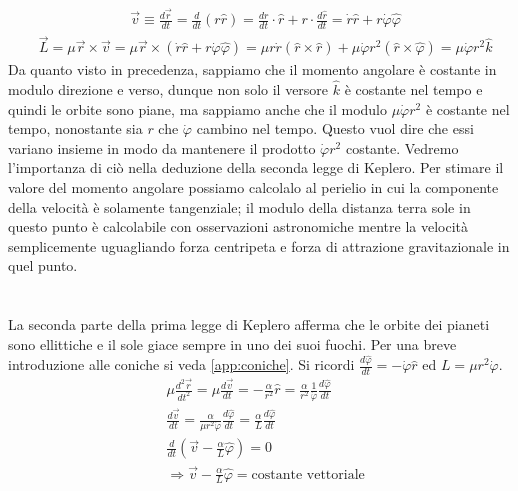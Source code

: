 \begin{align}\label{eq:velocitàgravitazionale}
&\vec{v} \equiv\frac{d\vec{r}}{dt}=\frac{d}{dt}(r\hat{r})=\frac{dr}{dt}\cdot \hat{r} + r\cdot \frac{d\hat{r}}{dt} = \dot{r}\hat{r} + r\dot{\varphi}\hat{\varphi}
\end{align}
\begin{align}\label{eq:momentoangolaregravitazionale}
&\vec{L} = \mu\vec{r} \times \vec{v} = \mu \vec{r} \times (\dot{r}\hat{r}+r\dot{\varphi}\hat{\varphi})=\mu r\dot{r}(\hat{r}\times\hat{r})+ \mu\dot{\varphi}r^2(\hat{r}\times\hat{\varphi}) = \mu\dot{\varphi}r^2 \hat{k} 
\end{align}
Da quanto visto in precedenza, sappiamo che il momento angolare è costante in modulo direzione e verso, dunque non solo il versore $\hat{k}$ è costante nel tempo e quindi le orbite sono piane, ma sappiamo anche che il modulo $\mu\dot{\varphi}r^2$ è costante nel tempo, nonostante sia $r$ che $\dot{\varphi}$ cambino nel tempo. Questo vuol dire che essi variano insieme in modo da mantenere il prodotto $\dot{\varphi}r^2$ costante. Vedremo l'importanza di ciò nella deduzione della seconda legge di Keplero. Per stimare il valore del momento angolare possiamo calcolalo al perielio in cui la componente della velocità è solamente tangenziale; il modulo della distanza terra sole in questo punto è calcolabile con osservazioni astronomiche mentre la velocità semplicemente uguagliando forza centripeta e forza di attrazione gravitazionale in quel punto. \\\\\\
La seconda parte della prima legge di Keplero afferma che le orbite dei pianeti sono ellittiche e il sole giace sempre in uno dei suoi fuochi. Per una breve introduzione alle coniche si veda \ref{app:coniche}. Si ricordi  $\frac{d\hat{\varphi}}{dt} = -\dot{\varphi}\hat{r}$ ed $L = \mu r^2 \dot{\varphi}$.
\begin{align*}
	&\mu\frac{d^2\vec{r}}{dt^2} = \mu\frac{d\vec{v}}{dt} = -\frac{\alpha}{r^2}\hat{r} = \frac{\alpha}{r^2}\frac{1}{\dot{\varphi}} \frac{d\hat{\varphi}}{dt}\\ &\frac{d\vec{v}}{dt} = \frac{\alpha}{\mu r^2\dot{\varphi}} \frac{d\hat{\varphi}}{dt}= \frac{\alpha}{L}\frac{d\hat{\varphi}}{dt}\\
	&\frac{d}{dt}(\vec{v}-\frac{\alpha}{L}\hat{\varphi}) = 0 \\
	& \Rightarrow \vec{v}-\frac{\alpha}{L}\hat{\varphi} = \text{costante vettoriale}
\end{align*}
